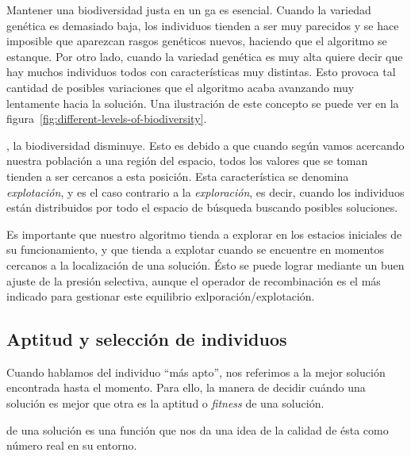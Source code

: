 Mantener una biodiversidad justa en un \gls{ga} es esencial. Cuando la variedad genética es demasiado baja, los individuos tienden a ser muy parecidos y se hace imposible que aparezcan rasgos genéticos nuevos, haciendo que el algoritmo se estanque. Por otro lado, cuando la variedad genética es muy alta quiere decir que hay muchos individuos todos con características muy distintas. Esto provoca tal cantidad de posibles variaciones que el algoritmo acaba avanzando muy lentamente hacia la solución. Una ilustración de este concepto se puede ver en la figura~\ref{fig:different-levels-of-biodiversity}.

, la biodiversidad disminuye. Esto es debido a que cuando según vamos acercando nuestra población a una región del espacio, todos los valores que se toman tienden a ser cercanos a esta posición. Esta característica se denomina \textit{explotación}, y es el caso contrario a la \textit{exploración}, es decir, cuando los individuos están distribuidos por todo el espacio de búsqueda buscando posibles soluciones.

Es importante que nuestro algoritmo tienda a explorar en los estacios iniciales de su funcionamiento, y que tienda a explotar cuando se encuentre en momentos cercanos a la localización de una solución. Ésto se puede lograr mediante un buen ajuste de la presión selectiva, aunque el operador de recombinación es el más indicado para gestionar este equilibrio exlporación/explotación.

\subsection{Aptitud y selección de individuos}

Cuando hablamos del individuo \enquote{más apto}, nos referimos a la mejor solución encontrada hasta el momento. Para ello, la manera de decidir cuándo una solución es mejor que otra es la aptitud o \textit{fitness} de una solución.

 de una solución es una función que nos da una idea de la calidad de ésta como número real en su entorno.


